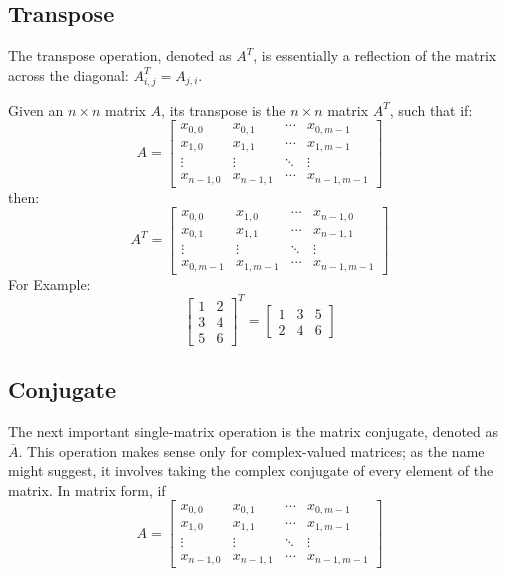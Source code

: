 \documentclass{article}
\begin{document}
\subsection{Transpose}
The transpose operation, denoted as $A^T$, is essentially a reflection of the matrix across the diagonal: $A^T_{i,j} = A_{j,i}$.

Given an $n \times n$ matrix $A$, its transpose is the $n \times n$ matrix $A^T$, such that if:
\begin{equation*}
    A =
\begin{bmatrix}
    x_{0,0} & x_{0,1} & \dotsb & x_{0,m-1} \\
    x_{1,0} & x_{1,1} & \dotsb & x_{1,m-1} \\
    \vdots & \vdots & \ddots & \vdots \\
    x_{n-1,0} & x_{n-1,1} & \dotsb & x_{n-1,m-1}
\end{bmatrix}
\end{equation*}
then:
\begin{equation*}
    A^T =
\begin{bmatrix}
    x_{0,0} & x_{1,0} & \dotsb & x_{n-1,0} \\
    x_{0,1} & x_{1,1} & \dotsb & x_{n-1,1} \\
    \vdots & \vdots & \ddots & \vdots \\
    x_{0,m-1} & x_{1,m-1} & \dotsb & x_{n-1,m-1}
\end{bmatrix}
\end{equation*}
For Example:
\begin{equation*}
\begin{bmatrix}
    1 & 2 \\
    3 & 4 \\
    5 & 6
\end{bmatrix}^T =
\begin{bmatrix}
    1 & 3 & 5 \\
    2 & 4 & 6
\end{bmatrix}
\end{equation*}
\subsection{Conjugate}
The next important single-matrix operation is the matrix conjugate, denoted as $\overline{A}$. This operation makes sense only for complex-valued matrices; as the name might suggest, it involves taking the complex conjugate of every element of the matrix. In matrix form, if
\begin{equation*}
    A =
\begin{bmatrix}
    x_{0,0} & x_{0,1} & \dotsb & x_{0,m-1} \\
    x_{1,0} & x_{1,1} & \dotsb & x_{1,m-1} \\
    \vdots & \vdots & \ddots & \vdots \\
    x_{n-1,0} & x_{n-1,1} & \dotsb & x_{n-1,m-1}
\end{bmatrix}
\end{equation*}
\end{document}
